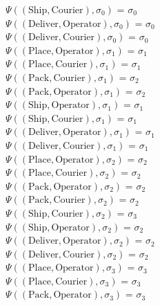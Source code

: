 \documentclass[a4paper]{article}
\begin{document}
$\Psi((\text{Ship},\text{Courier}),\sigma_0)$ = $\sigma_0$ \\[0.1\baselineskip] 
$\Psi((\text{Deliver}, \text{Operator}),\sigma_0)$ = $\sigma_0$ \\[0.1\baselineskip]
$\Psi((\text{Deliver}, \text{Courier}),\sigma_0)$ = $\sigma_0$ \\[0.7\baselineskip]
$\Psi((\text{Place},\text{Operator}),\sigma_1)$ = $\sigma_1$ \\[0.1\baselineskip] 
$\Psi((\text{Place},\text{Courier}),\sigma_1)$ = $\sigma_1$ \\[0.1\baselineskip] 
$\Psi((\text{Pack},\text{Courier}),\sigma_1)$ = $\sigma_2$ \\[0.1\baselineskip] 
$\Psi((\text{Pack},\text{Operator}),\sigma_1)$ = $\sigma_2$ \\[0.1\baselineskip] 
$\Psi((\text{Ship},\text{Operator}),\sigma_1)$ = $\sigma_1$ \\[0.1\baselineskip] 
$\Psi((\text{Ship},\text{Courier}),\sigma_1)$ = $\sigma_1$ \\[0.1\baselineskip] 
$\Psi((\text{Deliver},\text{Operator}),\sigma_1)$ = $\sigma_1$ \\[0.1\baselineskip] 
$\Psi((\text{Deliver},\text{Courier}),\sigma_1)$ = $\sigma_1$ \\[0.7\baselineskip] 
$\Psi((\text{Place},\text{Operator}),\sigma_2)$ = $\sigma_2$ \\[0.1\baselineskip] 
$\Psi((\text{Place},\text{Courier}),\sigma_2)$ = $\sigma_2$ \\[0.1\baselineskip] 
$\Psi((\text{Pack},\text{Operator}),\sigma_2)$ = $\sigma_2$ \\[0.1\baselineskip] 
$\Psi((\text{Pack},\text{Courier}),\sigma_2)$ = $\sigma_2$ \\[0.1\baselineskip] 
$\Psi((\text{Ship},\text{Courier}),\sigma_2)$ = $\sigma_3$ \\[0.1\baselineskip] 
$\Psi((\text{Ship},\text{Operator}),\sigma_2)$ = $\sigma_2$ \\[0.1\baselineskip] 
$\Psi((\text{Deliver},\text{Operator}),\sigma_2)$ = $\sigma_2$ \\[0.1\baselineskip] 
$\Psi((\text{Deliver},\text{Courier}),\sigma_2)$ = $\sigma_2$ \\[0.7\baselineskip] 
$\Psi((\text{Place},\text{Operator}),\sigma_3)$ = $\sigma_3$ \\[0.1\baselineskip] 
$\Psi((\text{Place},\text{Courier}),\sigma_3)$ = $\sigma_3$ \\[0.1\baselineskip] 
$\Psi((\text{Pack},\text{Operator}),\sigma_3)$ = $\sigma_3$ \\[0.1\baselineskip] 
\end{document}
